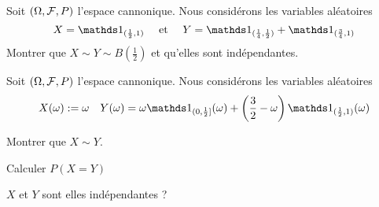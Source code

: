 \documentclass{report}
\begin{document}
\begin{exo}
    Soit \(\left(\Omega,\mathcal{F}, P\right)\) l'espace cannonique. Nous considérons
    les variables aléatoires \[X=\ind_{(\frac12, 1)}\quad\text{ et }\quad
    Y=\ind_{(\frac14,\frac12)} + \ind_{(\frac34, 1)}\] Montrer que \(X\sim Y
    \sim B(\frac12)\) et qu'elles sont indépendantes.
\end{exo}

\begin{exo}
    Soit \(\left(\Omega,\mathcal{F}, P\right)\) l'espace cannonique. Nous considérons
    les variables aléatoires \[X(\omega):=\omega\quad Y(\omega)=
    \omega\ind_{(0,\frac12]}(\omega)+\left(\frac32-\omega\right)
    \ind_{(\frac12, 1)}(\omega)\]
    \begin{q}{1}
        Montrer que \(X\sim Y\).
    \end{q}
    \begin{q}{2}
        Calculer \(P(X=Y)\)
    \end{q}
    \begin{q}{3}
        \(X\) et \(Y\) sont elles indépendantes ?
    \end{q}
\end{exo}
\end{document}
